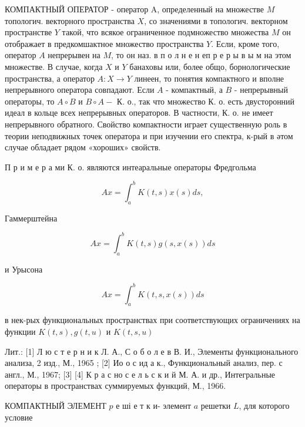 \documentclass[10pt]{article}
\begin{document}
КОМПАКТНЫЙ ОПЕРАТОР - оператор A, определенный на множестве $M$ топологич. векторного пространства $X$, со значениями в топологич. векторном пространстве $Y$ такой, что всякое ограниченное подмножество множества $M$ он отображает в предкомшактное множество пространства $Y$. Если, кроме того, оператор $A$ непрерывен на $M$, то он наз. в п о л н е н еп р е р ы в ы м на этом множестве. В случае, когда $X$ и $Y$ банаховы или, более общо, борнологические пространства, а оператор $A: X \rightarrow Y$ линеен, то понятия компактного и вполне непрерывного оператора совпадают. Если $A$ - компактный, а $B$ - непрерывный операторы, то $A \circ B$ и $B \circ A-$ К. о., так что множество К. о. есть двусторонний идеал в кольце всех непрерывных операторов. В частности, К. о. не имеет непрерывного обратного. Свойство компактности играет существенную роль в теории неподвижных точек оператора и при изучении его спектра, к-рый в әтом случае обладает рядом «хороших» свойств.



П р и м е р а ми К. о. являются интеаральные операторы Фредгольма



\[

A x=\int_{a}^{b} K(t, s) x(s) d s,

\]



Гаммерштейна



\[

A x=\int_{a}^{b} K(t, s) g(s, x(s)) d s

\]



и Урысона



\[

A x=\int_{a}^{b} K(t, s, x(s)) d s

\]



в нек-рых функциональных пространствах при соответствующих ограничениях на функции $K(t, s), g(t, u)$ и $K(t, s, u)$



Лит.: [1] Л ю с т е р н и к Л. А., С о б о л е в В. И., Элементы функционального анализа, 2 изд., М., 1965 ; [2] Ио о с ид а к., Функциональный анализ, пер. с англ., М., 1967; [3] [4] К р а с но с е л ь с к и й М. А. и др., Интегральные операторы в пространствах суммируемых функций, М., 1966.



КОМПАКТНЫЙ ЭЛЕМЕНТ $p$ е ші е т к и- элемент $a$ решетки $L$, для которого условие
\end{document}
